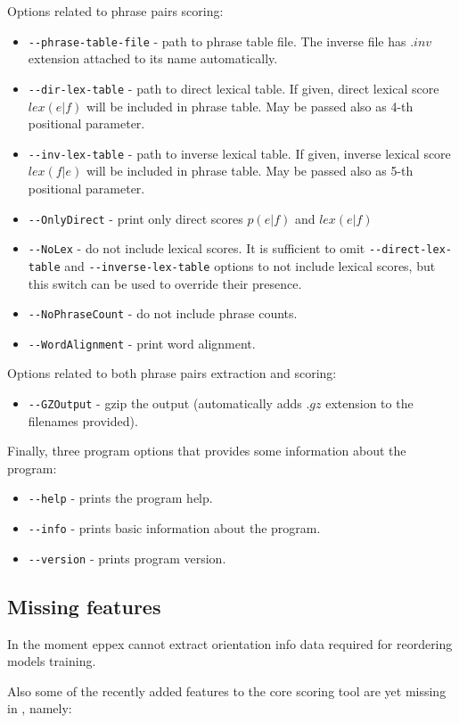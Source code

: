 Options related to phrase pairs scoring:
\begin{itemize}
 \item \verb|--phrase-table-file| - path to phrase table file.
  The inverse file has $.inv$ extension attached to its name automatically.
 \item \verb|--dir-lex-table| - path to direct lexical table.
  If given, direct lexical score $lex(e|f)$ will be included in phrase table.
  May be passed also as 4-th positional parameter.
 \item \verb|--inv-lex-table| - path to inverse lexical table.  
  If given, inverse lexical score $lex(f|e)$ will be included in phrase table.
  May be passed also as 5-th positional parameter.
 \item \verb|--OnlyDirect| - print only direct scores $p(e|f)$ and $lex(e|f)$
 \item \verb|--NoLex| - do not include lexical scores.
  It is sufficient to omit \verb|--direct-lex-table| and \verb|--inverse-lex-table|
  options to not include lexical scores, but this switch can be used to
  override their presence.
 \item \verb|--NoPhraseCount| - do not include phrase counts.  
 \item \verb|--WordAlignment| - print word alignment.
\end{itemize}

Options related to both phrase pairs extraction and scoring:
\begin{itemize}
 \item \verb|--GZOutput| - gzip the output (automatically
  adds $.gz$ extension to the filenames provided).
\end{itemize}

Finally, three program options that provides some information about the program:
\begin{itemize}
 \item \verb|--help| - prints the program help.
 \item \verb|--info| - prints basic information about the program.
 \item \verb|--version| - prints program version.
\end{itemize}

\subsection{Missing features}

In the moment eppex cannot extract orientation info data required for reordering models training.

Also some of the recently added features to the core scoring tool are yet missing in \eppex{},
namely:
